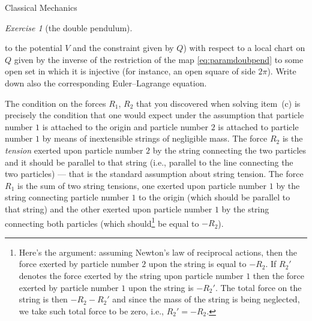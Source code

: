 \documentclass[oneside,a4paper,11pt]{amsbook}
\theoremstyle{remark}\newtheorem{exercise}{Exercise}[chapter]
\theoremstyle{plain}\newtheorem{teo}{Theorem}[section]
\theoremstyle{plain}\newtheorem{lem}[teo]{Lemma}
\theoremstyle{plain}\newtheorem{prop}[teo]{Proposition}
\theoremstyle{plain}\newtheorem{cor}[teo]{Corollary}
\theoremstyle{definition}\newtheorem{defin}[teo]{Definition}
\theoremstyle{remark}\newtheorem{rem}[teo]{Remark}
\theoremstyle{definition}\newtheorem{notation}[teo]{Notation}
\theoremstyle{definition}\newtheorem{convention}[teo]{Convention}
\theoremstyle{definition}\newtheorem{example}[teo]{Example}
\numberwithin{section}{chapter}
\numberwithin{equation}{section}
\begin{document}
\begin{chapter}{Classical Mechanics}
\begin{exercise}[the double pendulum]
\begin{itemize}
to the potential $V$ and the constraint given by $Q$) with respect to a local chart on
$Q$ given by the inverse of the restriction of the map \eqref{eq:paramdoubpend} to some open set in which
it is injective (for instance, an open square of side $2\pi$). Write down also the corresponding Euler--Lagrange equation.
\end{itemize}
The condition on the forces $R_1$, $R_2$ that you discovered when solving item~(c) is precisely the condition that
one would expect under the assumption that particle number $1$ is attached to the origin and particle number $2$ is
attached to particle number $1$ by means of inextensible strings of negligible mass. The force $R_2$ is the {\em tension\/}
exerted upon particle number $2$ by the string connecting the two particles and it should be parallel to that string
(i.e., parallel to the line connecting the two particles) --- that is the standard assumption about string tension.
The force $R_1$ is the sum of two string tensions, one exerted upon particle number $1$
by the string connecting particle number $1$ to the origin (which should be parallel to that string) and the
other exerted upon particle number $1$ by the string connecting both particles (which should\footnote{%
Here's the argument: assuming Newton's law of reciprocal actions, then the force exerted by particle number $2$ upon the
string is equal to $-R_2$. If $R_2'$ denotes the force exerted by the string upon particle number $1$ then the force
exerted by particle number $1$ upon the string is $-R_2'$. The total force on the string is then $-R_2-R_2'$ and since
the mass of the string is being neglected, we take such total force to be zero, i.e., $R_2'=-R_2$.}
be equal to $-R_2$).
\end{exercise}


\end{chapter}
\end{document}

